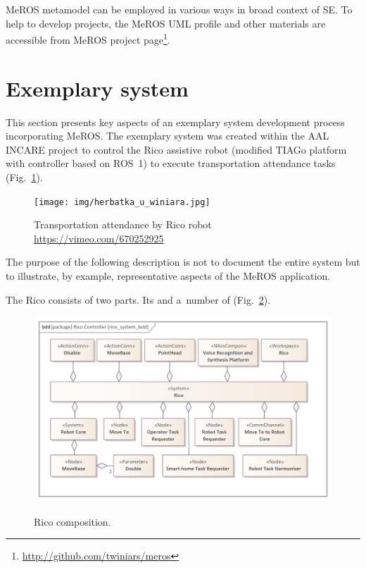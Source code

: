 \documentclass[11pt,oneside,a4paper]{report}
\begin{document}
	
	MeROS metamodel can be employed in various ways in broad context of SE. To help to develop projects, the MeROS UML profile and other materials are accessible from MeROS project page\footnote{\url{http://github.com/twiniars/meros}}. 
	
	
\section{Exemplary system}
\label{ch:application-example}

	This section presents key aspects of an exemplary system development process incorporating MeROS. The exemplary system was created within the AAL INCARE project to control the Rico assistive robot (modified TIAGo platform with controller based on ROS~1) to execute transportation attendance tasks (Fig.~\ref{fig:herbatka_u_winiara}).
	
	\begin{figure}[H]
		\centering
		\begin{center}
			{\texttt{[image: img/herbatka\_u\_winiara.jpg]}}
		\end{center}
		\caption{Transportation attendance by Rico robot \url{https://vimeo.com/670252925}} 
		\label{fig:herbatka_u_winiara}
	\end{figure}
	
	
	
	 The purpose of the following description is not to document the entire system but to illustrate, by example, representative aspects of the MeROS application.
	 
	\newpage
	The Rico \stSystem{} consists of two parts. Its \stWorkspace{} and a~number of \stRunSystemCompon{} (Fig.~\ref{fig:rico_system_bdd}).
	
	
	\begin{figure}[H] 
		\centering
		\begin{center}
			{\includegraphics[scale=.9]{img/rico_pkg/rico_system_bdd.png}}
		\end{center}
		\caption{Rico \stSystem{} composition.} 
		\label{fig:rico_system_bdd}
	\end{figure}
	
\end{document}
